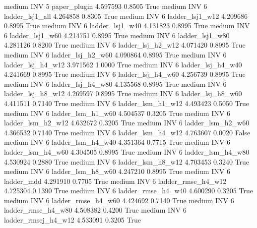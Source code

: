     medium      INV                 5        paper_plugin   4.597593      0.8505    True
    medium      INV                 6     ladder_lsj1_all   4.264858      0.8305    True
    medium      INV                 6     ladder_lsj1_w12   4.209686      0.8995    True
    medium      INV                 6     ladder_lsj1_w40   4.131823      0.8995    True
    medium      INV                 6     ladder_lsj1_w60   4.214751      0.8995    True
    medium      INV                 6     ladder_lsj1_w80   4.281126      0.8200    True
    medium      INV                 6   ladder_lsj_h2_w12   4.071420      0.8995    True
    medium      INV                 6   ladder_lsj_h2_w60   4.090864      0.8995    True
    medium      INV                 6   ladder_lsj_h4_w12   3.971562      1.0000    True
    medium      INV                 6   ladder_lsj_h4_w40   4.241669      0.8995    True
    medium      INV                 6   ladder_lsj_h4_w60   4.256739      0.8995    True
    medium      INV                 6   ladder_lsj_h4_w80   4.135568      0.8995    True
    medium      INV                 6   ladder_lsj_h8_w12   4.269597      0.8995    True
    medium      INV                 6   ladder_lsj_h8_w60   4.411511      0.7140    True
    medium      INV                 6   ladder_lsm_h1_w12   4.493423      0.5050    True
    medium      INV                 6   ladder_lsm_h1_w60   4.504537      0.3205    True
    medium      INV                 6   ladder_lsm_h2_w12   4.632672      0.3205    True
    medium      INV                 6   ladder_lsm_h2_w60   4.366532      0.7140    True
    medium      INV                 6   ladder_lsm_h4_w12   4.763607      0.0020   False
    medium      INV                 6   ladder_lsm_h4_w40   4.351364      0.7715    True
    medium      INV                 6   ladder_lsm_h4_w60   4.304505      0.8995    True
    medium      INV                 6   ladder_lsm_h4_w80   4.530924      0.2880    True
    medium      INV                 6   ladder_lsm_h8_w12   4.703453      0.3240    True
    medium      INV                 6   ladder_lsm_h8_w60   4.247210      0.8995    True
    medium      INV                 6          ladder_mdd   4.291910      0.7705    True
    medium      INV                 6  ladder_rmse_h4_w12   4.725304      0.1390    True
    medium      INV                 6  ladder_rmse_h4_w40   4.600290      0.3205    True
    medium      INV                 6  ladder_rmse_h4_w60   4.424692      0.7140    True
    medium      INV                 6  ladder_rmse_h4_w80   4.508382      0.4200    True
    medium      INV                 6 ladder_rmsej_h4_w12   4.533091      0.3205    True
